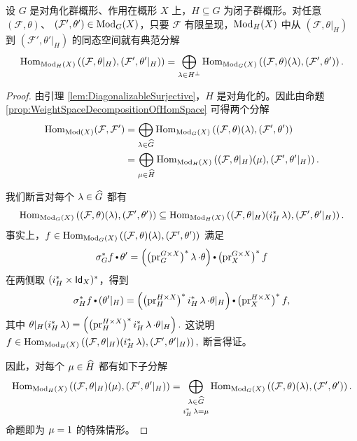 \begin{prop}
\label{prop:HInvariantsOfHomSpace}
设 $G$ 是对角化群概形、作用在概形 $X$ 上，$H\subseteq G$ 为闭子群概形。对任意
$(\mathcal{F}, \theta)$、
$(\mathcal{F}', \theta') \in \operatorname{\mathrm{Mod}}_G(X)$，只要 $\mathcal{F}$ 有限呈现，$\operatorname{\mathrm{Mod}}_H(X)$ 中从 $(\mathcal{F}, \theta|_H)$ 到 $(\mathcal{F}', \theta'|_H)$ 的同态空间就有典范分解
$$
\operatorname{Hom}_{\operatorname{\mathrm{Mod}}_H(X)}\left( (\mathcal{F}, \theta|_H), (\mathcal{F}', \theta'|_H) \right)
=
\bigoplus_{\operatorname{\lambda} \in H^\perp} \operatorname{Hom}_{\operatorname{\mathrm{Mod}}_G(X)}\left( (\mathcal{F}, \theta)(\operatorname{\lambda}), (\mathcal{F}', \theta') \right).
$$
\end{prop}

\begin{proof}
由引理 \ref{lem:DiagonalizableSurjective}，$H$ 是对角化的。因此由命题 \ref{prop:WeightSpaceDecompositionOfHomSpace} 可得两个分解
\begin{align*}
\operatorname{Hom}_{\operatorname{\mathrm{Mod}}(X)}(\mathcal{F}, \mathcal{F}') 
&=
\bigoplus_{\operatorname{\lambda} \in \widehat{G}} \operatorname{Hom}_{\operatorname{\mathrm{Mod}}_G(X)}\left( (\mathcal{F}, \theta)(\operatorname{\lambda}), (\mathcal{F}', \theta') \right)
\\
&=
\bigoplus_{\operatorname{\mu} \in \widehat{H}} \operatorname{Hom}_{\operatorname{\mathrm{Mod}}_H(X)}\left( (\mathcal{F}, \theta|_H)(\operatorname{\mu}), (\mathcal{F}', \theta'|_H) \right).
\end{align*}

我们断言对每个 $\operatorname{\lambda}\in\widehat{G}$ 都有
$$
\operatorname{Hom}_{\operatorname{\mathrm{Mod}}_G(X)}\left( (\mathcal{F}, \theta)(\operatorname{\lambda}), (\mathcal{F}', \theta') \right)
\subseteq
\operatorname{Hom}_{\operatorname{\mathrm{Mod}}_H(X)}\left( (\mathcal{F}, \theta|_H)(i_H^*\operatorname{\lambda}), (\mathcal{F}', \theta'|_H) \right).
$$
事实上，$f\in\operatorname{Hom}_{\operatorname{\mathrm{Mod}}_G(X)}\left( (\mathcal{F}, \theta)(\operatorname{\lambda}), (\mathcal{F}', \theta') \right)$ 满足
$$
\sigma_G^* f\comp \theta'
=
\left(\left(\pr_G^{G\times X}\right)^*\cha \cdot \theta\right)
\comp
\left(\pr_X^{G\times X}\right)^* f
$$
在两侧取 $(i_H^*\times \operatorname{\mathsf{Id}}_X)^*$，得到
$$
\sigma_H^*f\comp\left(\theta'|_H\right)
=
\left(
\left(\pr_H^{H\times X}\right)^*
i_H^*\cha
\cdot
\theta|_H
\right)
\comp
\left(\pr_X^{H\times X}\right)^*f,
$$
其中
$
\theta|_H
(i_H^*\operatorname{\lambda})
=
\left(
\left(\operatorname{\operatorname{pr}}_H^{H\times X}\right)^*
i_H^*\operatorname{\lambda}
\cdot
\theta|_H
\right).
$
这说明
$
f\in
\operatorname{Hom}_{\operatorname{\mathrm{Mod}}_H(X)}\left( (\mathcal{F}, \theta|_H)(i_H^*\operatorname{\lambda}), (\mathcal{F}', \theta'|_H) \right),
$
断言得证。

因此，对每个 $\operatorname{\mu}\in\widehat{H}$ 都有如下子分解
$$
\operatorname{Hom}_{\operatorname{\mathrm{Mod}}_H(X)}\left( (\mathcal{F}, \theta|_H)(\operatorname{\mu}), (\mathcal{F}', \theta'|_H) \right)
=
\bigoplus_{\substack{\operatorname{\lambda} \in \widehat{G} \\[1mm] i_H^*\operatorname{\lambda} = \operatorname{\mu}}} \operatorname{Hom}_{\operatorname{\mathrm{Mod}}_G(X)}\left( (\mathcal{F}, \theta)(\operatorname{\lambda}), (\mathcal{F}', \theta') \right).
$$
命题即为 $\operatorname{\mu}=1$ 的特殊情形。
\end{proof}

